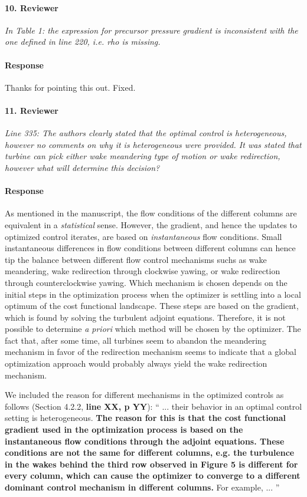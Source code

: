 \documentclass[]{article}
\newcommand{\red}[1]{\textbf{\color{red} #1}}
\newcommand{\revision}[1]{\textbf{#1}}
\begin{document}
\hrulefill

\paragraph{10. Reviewer} \textit{In Table 1: the expression for precursor pressure gradient is inconsistent with the one defined in line 220, i.e. rho is missing.}

\paragraph{Response} Thanks for pointing this out. Fixed. 

\hrulefill

\paragraph{11. Reviewer} \textit{Line 335: The authors clearly stated that the optimal control is heterogeneous, however no comments on why it is heterogeneous were provided. It was stated that turbine can pick either wake meandering type of motion or wake redirection, however what will determine this decision?}

\paragraph{Response} As mentioned in the manuscript, the flow conditions of the different columns are equivalent in a \emph{statistical} sense. However, the gradient, and hence the updates to optimized control iterates, are based on \emph{instantaneous} flow conditions. Small instantaneous differences in flow conditions between different columns can hence tip the balance between different flow control mechanisms suchs as wake meandering, wake redirection through clockwise yawing, or wake redirection through counterclockwise yawing. Which mechanism is chosen depends on the initial steps in the optimization process when the optimizer is settling into a local optimum of the cost functional landscape. These steps are based on the gradient, which is found by solving the turbulent adjoint equations. Therefore, it is not possible to determine \emph{a priori} which method will be chosen by the optimizer. The fact that, after some time, all turbines seem to abandon the meandering mechanism in favor of the redirection mechanism seems to indicate that a global optimization approach would probably always yield the wake redirection mechanism.

We included the reason for different mechanisms in the optimized controls as follows (Section 4.2.2, \red{line XX, p YY}):
``
... their behavior in an optimal control setting is heterogeneous. \revision{The reason for this is that the cost functional gradient used in the optimization process is based on the instantaneous flow conditions through the adjoint equations. These conditions are not the same for different columns, e.g. the turbulence in the wakes behind the third row observed in Figure 5 is different for every column, which can cause the optimizer to converge to a different dominant control mechanism in different columns.} For example, ...
''
\end{document}

